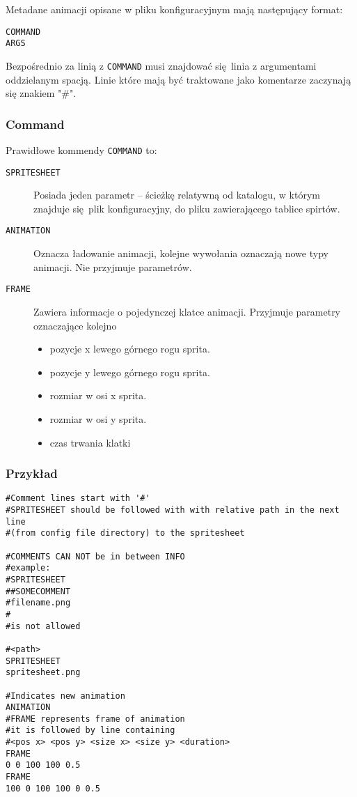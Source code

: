 \documentclass[11pt]{article}
\begin{document}
Metadane animacji opisane w pliku konfiguracyjnym mają następujący format:

\begin{verbatim}
COMMAND
ARGS
\end{verbatim}

Bezpośrednio za linią z \texttt{COMMAND} musi znajdować się linia z argumentami oddzielanym spacją.
Linie które mają być traktowane jako komentarze zaczynają się znakiem "\#".
\subsubsection{Command}
\label{sec:org91d437f}

Prawidłowe kommendy \texttt{COMMAND} to:
\begin{description}
\item[{\texttt{SPRITESHEET}}] Posiada jeden parametr -- ścieżkę relatywną od katalogu, w którym znajduje się plik konfiguracyjny, do pliku zawierającego tablice spirtów.

\item[{\texttt{ANIMATION}}] Oznacza ładowanie animacji, kolejne wywołania oznaczają nowe typy animacji. Nie przyjmuje parametrów.

\item[{\texttt{FRAME}}] Zawiera informacje o pojedynczej klatce animacji.
Przyjmuje parametry oznaczające kolejno
\begin{itemize}
\item pozycje x lewego górnego rogu sprita.
\item pozycje y lewego górnego rogu sprita.
\item rozmiar w osi x sprita.
\item rozmiar w osi y sprita.
\item czas trwania klatki
\end{itemize}
\end{description}
\subsubsection{Przykład}
\label{sec:org79e4ddf}
\begin{verbatim}
#Comment lines start with '#'
#SPRITESHEET should be followed with with relative path in the next line
#(from config file directory) to the spritesheet

#COMMENTS CAN NOT be in between INFO
#example:
#SPRITESHEET
##SOMECOMMENT
#filename.png
#
#is not allowed

#<path>
SPRITESHEET
spritesheet.png

#Indicates new animation
ANIMATION
#FRAME represents frame of animation
#it is followed by line containing
#<pos x> <pos y> <size x> <size y> <duration>
FRAME
0 0 100 100 0.5
FRAME
100 0 100 100 0 0.5
\end{verbatim}
\end{document}
